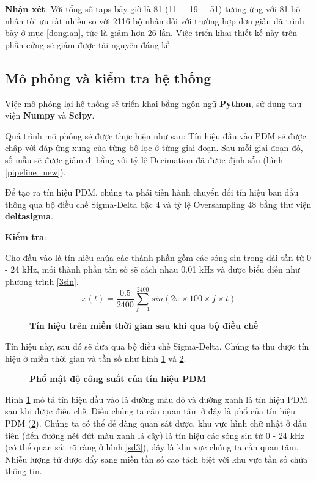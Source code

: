 \noindent \textbf{Nhận xét}: Với tổng số taps bây giờ là 81 (11 + 19 + 51) tương ứng với 81 bộ nhân tối ưu rất nhiều so với 2116 bộ nhân đối với trường hợp đơn giản đã trình bày ở mục \ref{dongian}, tức là giảm hơn 26 lần.
Việc triển khai thiết kế này trên phần cứng sẽ giảm được tài nguyên đáng kể.
\subsection{Mô phỏng và kiểm tra hệ thống}
Việc mô phỏng lại hệ thống sẽ triển khai bằng ngôn ngữ \textbf{Python}, sử dụng thư viện \textbf{Numpy} và \textbf{Scipy}.

Quá trình mô phỏng sẽ được thực hiện như sau: Tín hiệu đầu vào PDM sẽ được chập với đáp ứng xung của từng bộ lọc ở từng giai đoạn. Sau mỗi giai đoạn đó, số mẫu sẽ được giảm đi bằng với tỷ lệ Decimation đã được định sẵn (hình \ref{pipeline_new}).

Để tạo ra tín hiệu PDM, chúng ta phải tiến hành chuyển đổi tín hiệu ban đầu thông qua bộ điều chế Sigma-Delta bậc 4 và tỷ lệ Oversampling 48 bằng thư viện \textbf{deltasigma}.

\textbf{Kiểm tra}:

Cho đầu vào là tín hiệu chứa các thành phần gồm các sóng sin trong dải tần từ 0 - 24 kHz, mỗi thành phần tần số sẽ cách nhau 0.01 kHz và được biểu diễn như phương trình \ref{3sin}.
\begin{equation} \label{3sin}
    x(t) = \frac{0.5}{2400}\sum^{2400}_{f = 1}sin(2\pi \times 100 \times f \times t)
\end{equation}


\begin{figure}[H]
    \centering
    
    \caption[Tín hiệu trên miền thời gian sau khi qua bộ điều chế]{\bfseries \fontsize{12pt}{0pt}\selectfont Tín hiệu trên miền thời gian sau khi qua bộ điều chế}
    \label{sd1}
\end{figure}
Tín hiệu này, sau đó sẽ đưa qua bộ điều chế Sigma-Delta. Chúng ta thu được tín hiệu ở miền thời gian và tần số như hình \ref{sd1} và \ref{sd2}.
\begin{figure}[H]
    \centering
    
    \caption[Phổ mật độ công suất của tín hiệu PDM]{\bfseries \fontsize{12pt}{0pt}\selectfont Phổ mật độ công suất của tín hiệu PDM}
    \label{sd2}
\end{figure}

Hình \ref{sd1} mô tả tín hiệu đầu vào là đường màu đỏ và đường xanh là tín hiệu PDM sau khi được điều chế. Điều chúng ta cần quan tâm ở đây là phổ của tín hiệu PDM (\ref{sd2}). Chúng ta có thể dễ dàng quan sát được, khu vực hình chữ nhật ở đầu tiên (đến đường nét đứt màu xanh lá cây) là tín hiệu các sóng sin từ 0 - 24 kHz  (có thể quan sát rõ ràng ở hình \ref{sd3}), đây là khu vực chúng ta cần quan tâm. Nhiễu lượng tử được đẩy sang miền tần số cao tách biệt với khu vực tần số chứa thông tin.

